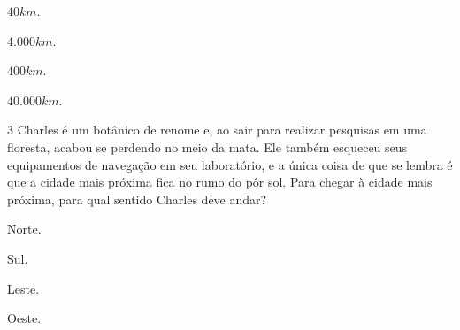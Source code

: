 \begin{escolha}[itemsep=0pt]
\item $40 km$.
\item $4.000 km$.
\item $400 km$.
\item $40.000 km$.
\end{escolha}









\num{3} Charles é um botânico de renome e, ao sair para realizar pesquisas em
uma floresta, acabou se perdendo no meio da mata. Ele também esqueceu
seus equipamentos de navegação em seu laboratório, e a única coisa de
que se lembra é que a cidade mais próxima fica no rumo do pôr sol. Para
chegar à cidade mais próxima, para qual sentido Charles deve andar?

\begin{escolha}[itemsep=0pt]
\item Norte.
\item Sul.
\item Leste.
\item Oeste.
\end{escolha}




